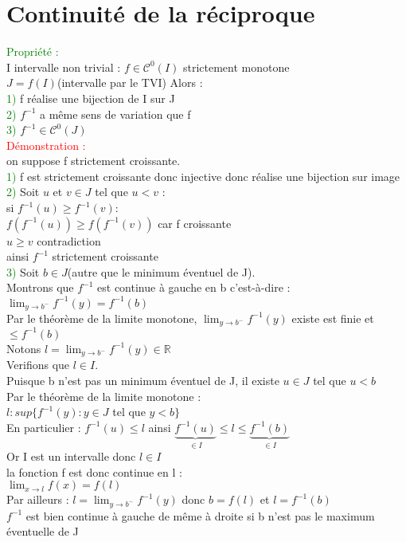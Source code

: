 \documentclass{article}
\begin{document}
\section{Continuité de la réciproque}
\textcolor{green}{Propriété :} \\ 
I intervalle non trivial : $f \in \mathcal{C}^0(I)$ strictement monotone \\ 
$J=f(I)$(intervalle par le TVI) Alors : \\ 
\textcolor{green}{1)} f réalise une bijection de I sur J \\ 
\textcolor{green}{2)} $f^{-1}$ a même sens de variation que f \\ 
\textcolor{green}{3)} $f^{-1} \in \mathcal{C}^0(J)$ \\ 
\textcolor{red}{Démonstration :} \\ 
on suppose f strictement croissante. \\ 
\textcolor{green}{1)} f est strictement croissante donc injective donc réalise une bijection sur image \\ 
\textcolor{green}{2)} Soit $u$ et $v \in J$ tel que $u<v$ : \\ 
si $f^{-1}(u) \geq f^{-1}(v)$: \\
$f(f^{-1}(u))\geq f(f^{-1}(v))$ car f croissante \\ 
$u\geq v$ contradiction \\ 
ainsi $f^{-1}$ strictement croissante \\ 
\textcolor{green}{3)} Soit $b \in J$(autre que le minimum éventuel de J). \\ 
Montrons que $f^{-1}$ est continue à gauche en b c'est-à-dire : \\ 
$\lim_{y \rightarrow b^-} f^{-1}(y)=f^{-1}(b)$ \\ 
Par le théorème de la limite monotone, $\lim_{y \rightarrow b^-} f^{-1}(y)$ existe est finie et $\leq f^{-1}(b)$ \\ 
Notons $l=\lim_{y \rightarrow b^-} f^{-1}(y) \in \mathbb{R}$ \\ 
Verifions que $l \in I$. \\ 
Puisque b n'est pas un minimum éventuel de J, il existe $u \in J$ tel que $u< b$ \\ 
Par le théorème de la limite monotone : \\ 
$l : sup \lbrace f^{-1}(y): y\in J$ tel que $y<b \rbrace$ \\ 
En particulier : $f^{-1}(u) \leq l$ ainsi $\underbrace{f^{-1}(u)}_{\in I} \leq l \leq \underbrace{f^{-1}(b)}_{\in I}$ \\ 
Or I est un intervalle donc $l \in I$ \\ 
la fonction f est donc continue en l : \\ 
$\lim_{x \rightarrow l} f(x)=f(l)$ \\ 
Par ailleurs : $l=\lim_{y \rightarrow b^-} f^{-1}(y)$ donc $b =f(l)$ et $l=f^{-1}(b)$ \\ 
$f^{-1}$ est bien continue à gauche de même à droite si b n'est pas le maximum éventuelle de J
\end{document}
